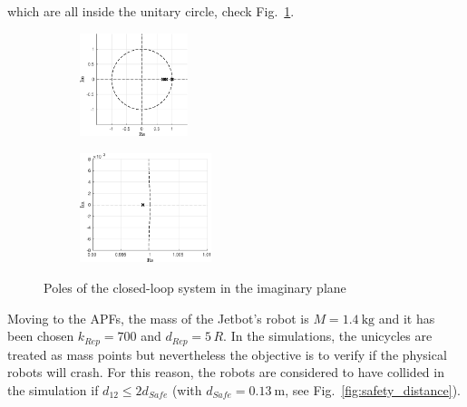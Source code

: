 \documentclass{ifacconf}
\begin{document}
which are all inside the unitary circle,
check Fig.~\ref{fig:poles-simulation}.
\begin{figure}[b]
    \centering
    \hspace{-1.5cm}
    \begin{subfigure}[b]{0.3\columnwidth}
        \includegraphics[height=3cm]{images/simulations/poles_simulations.eps}
    \end{subfigure}
    \hspace{0.3cm}
    \begin{subfigure}[b]{0.3\columnwidth}
        \includegraphics[height=3.2cm]{images/simulations/poles_simulations_zoom.eps}
    \end{subfigure}
    \caption{Poles of the closed-loop system in the imaginary plane}
    \label{fig:poles-simulation}
\end{figure}
Moving to the APFs, the mass of the Jetbot's robot is 
$M = \SI{1.4}{\kilo\gram}$ and it has been chosen $k_{Rep} = 700$
and $d_{Rep} = 5 \, R$.
In the simulations, the unicycles are treated as mass points but
nevertheless the objective is to verify if the physical robots will crash.
For this reason, the robots are considered to have collided in the simulation
if $d_{12} \leq 2 d_{Safe}$ (with $d_{Safe} = \SI{0.13}{\meter}$, 
see Fig.~\ref{fig:safety_distance}).
\end{document}
